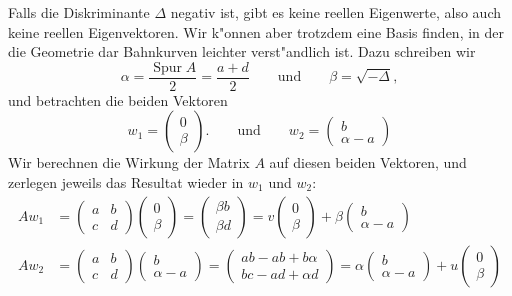 Falls die Diskriminante $\Delta$ negativ ist, gibt es keine reellen
Eigenwerte, also auch keine reellen Eigenvektoren.
Wir k"onnen aber trotzdem eine Basis finden, in der die Geometrie
dar Bahnkurven leichter verst"andlich ist.
Dazu schreiben wir 
\[
\alpha = \frac{\operatorname{Spur}A}2=\frac{a+d}2
\qquad
\text{und}
\qquad
\beta = \sqrt{-\Delta},
\]
und betrachten die beiden Vektoren
\[
w_1 = \begin{pmatrix}0\\\beta\end{pmatrix}.
\qquad\text{und}\qquad
w_2 = \begin{pmatrix}b\\\alpha-a\end{pmatrix}
\]
Wir berechnen die Wirkung der Matrix $A$ auf diesen beiden Vektoren,
und zerlegen jeweils das Resultat wieder in $w_1$ und $w_2$:
\begin{align*}
Aw_1
&=
\begin{pmatrix}a&b\\c&d\end{pmatrix}
\begin{pmatrix}0\\\beta\end{pmatrix}
=
\begin{pmatrix}
\beta b\\
\beta d
\end{pmatrix}
=
v
\begin{pmatrix}0\\\beta\end{pmatrix}
+
\beta
\begin{pmatrix}b\\\alpha-a\end{pmatrix}
\\
Aw_2
&=
\begin{pmatrix}a&b\\c&d\end{pmatrix}
\begin{pmatrix}b\\\alpha-a\end{pmatrix}
=
\begin{pmatrix}
ab-ab+b\alpha\\
bc-ad+\alpha d
\end{pmatrix}
=
\alpha
\begin{pmatrix}b\\\alpha-a\end{pmatrix}
+u
\begin{pmatrix}0\\\beta\end{pmatrix}
\end{align*}
